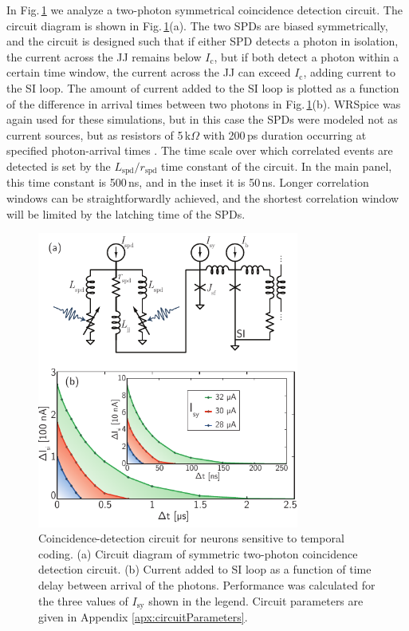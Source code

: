 \documentclass[twocolumn]{article}
\begin{document}
In Fig.\,\ref{fig:receivers_coincidence} we analyze a two-photon symmetrical coincidence detection circuit. The circuit diagram is shown in Fig.\,\ref{fig:receivers_coincidence}(a). The two SPDs are biased symmetrically, and the circuit is designed such that if either SPD detects a photon in isolation, the current across the JJ remains below $I_{\mathrm{c}}$, but if both detect a photon within a certain time window, the current across the JJ can exceed $I_{\mathrm{c}}$, adding current to the SI loop. The amount of current added to the SI loop is plotted as a function of the difference in arrival times between two photons in Fig.\,\ref{fig:receivers_coincidence}(b). WRSpice was again used for these simulations, but in this case the SPDs were modeled not as current sources, but as resistors of 5\,k$\Omega$ with 200\,ps duration occurring at specified photon-arrival times \cite{yake2007}. The time scale over which correlated events are detected is set by the $L_{\mathrm{spd}}/r_{\mathrm{spd}}$ time constant of the circuit. In the main panel, this time constant is 500\,ns, and in the inset it is 50\,ns. Longer correlation windows can be straightforwardly achieved, and the shortest correlation window will be limited by the latching time of the SPDs.
\begin{figure}[t!]
	\centerline{\includegraphics[width=8.6cm]{_receivers_coincidence_small.pdf}}
	\caption{\label{fig:receivers_coincidence}Coincidence-detection circuit for neurons sensitive to temporal coding. (a) Circuit diagram of symmetric two-photon coincidence detection circuit. (b) Current added to SI loop as a function of time delay between arrival of the photons. Performance was calculated for the three values of $I_{\mathrm{sy}}$ shown in the legend. Circuit parameters are given in Appendix \ref{apx:circuitParameters}.}
\end{figure}
\end{document}
